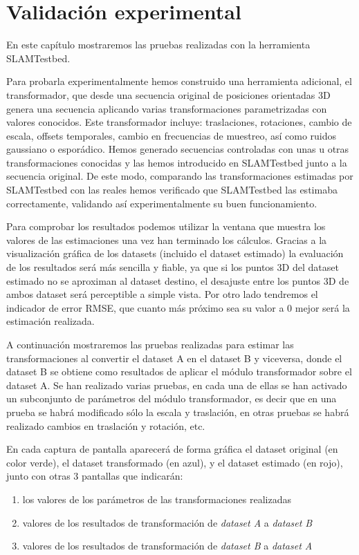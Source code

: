 \newpage
\chapter{Validación experimental} \label{cap:experimentos}
En este capítulo mostraremos las pruebas realizadas con la herramienta SLAMTestbed.

Para probarla experimentalmente hemos construido una herramienta adicional, el transformador, que desde una secuencia original de posiciones orientadas 3D genera una secuencia aplicando varias transformaciones parametrizadas con valores conocidos. Este transformador incluye: traslaciones, rotaciones, cambio de escala, offsets temporales, cambio en frecuencias de muestreo, así como ruidos gaussiano o esporádico.
Hemos generado secuencias controladas con unas u otras transformaciones conocidas y las hemos introducido en SLAMTestbed junto a la secuencia original. De este modo, comparando las transformaciones estimadas por SLAMTestbed con las reales hemos verificado que SLAMTestbed las estimaba correctamente, validando así experimentalmente su buen funcionamiento.

Para comprobar los resultados podemos utilizar la ventana que muestra los valores de las estimaciones una vez han terminado los cálculos. Gracias a la visualización gráfica de los datasets (incluido el dataset estimado) la evaluación de los resultados será más sencilla y fiable, ya que si los puntos 3D del dataset estimado no se aproximan al dataset destino, el desajuste entre los puntos 3D de ambos dataset será perceptible a simple vista. 
Por otro lado tendremos el indicador de error RMSE, que cuanto más próximo sea su valor a 0 mejor será la estimación realizada.

A continuación mostraremos las pruebas realizadas para estimar las transformaciones al convertir el dataset A en el dataset B y viceversa, donde el dataset B se obtiene como resultados de aplicar el módulo transformador sobre el dataset A.
Se han realizado varias pruebas, en cada una de ellas se han activado un subconjunto de parámetros del módulo transformador, es decir que en una prueba se habrá modificado sólo la escala y traslación, en otras pruebas se habrá realizado cambios en traslación y rotación, etc.

En cada captura de pantalla aparecerá de forma gráfica el dataset original (en color verde), el dataset transformado (en azul), y el dataset estimado (en rojo), junto con otras 3 pantallas que indicarán:
\begin{enumerate}
 \item{los valores de los parámetros de las transformaciones realizadas} 
 \item{valores de los resultados de transformación de \textit{dataset A} a \textit{dataset B}}
 \item{valores de los resultados de transformación de \textit{dataset B} a \textit{dataset A}}
\end{enumerate}


